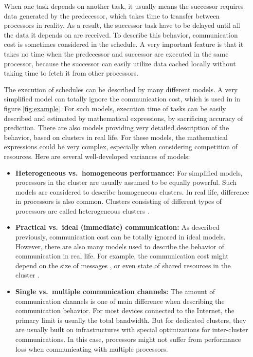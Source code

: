 \documentclass[msc,deptreport, cs]{infthesis}
\begin{document}
When one task depends on another task, it usually means the successor requires data generated by the predecessor, which takes time to transfer between processors in reality. As a result, the successor task have to be delayed until all the data it depends on are received. To describe this behavior, communication cost is sometimes considered in the schedule. A very important feature is that it takes no time when the predecessor and successor are executed in the same processor, because the successor can easily utilize data cached locally without taking time to fetch it from other processors.

The execution of schedules can be described by many different models. A very simplified model can totally ignore the communication cost, which is used in in figure \ref{fig:example}. For such models, execution time of tasks can be easily described and estimated by mathematical expressions, by sacrificing accuracy of prediction. There are also models providing very detailed description of the behavior, based on clusters in real life. For these models, the mathematical expressions could be very complex, especially when considering competition of resources. Here are several well-developed variances of models:
\begin{itemize}
    \item \textbf{Heterogeneous vs.\ homogeneous performance:} For simplified models, processors in the cluster are usually assumed to be equally powerful. Such models are considered to describe homogeneous clusters. In real life, difference in processors is also common. Clusters consisting of different types of processors are called heterogeneous clusters \cite{Topcuoglu}. 
    \item \textbf{Practical vs.\ ideal (immediate) communication:} As described previously, communication cost can be totally ignored in ideal models. However, there are also many models used to describe the behavior of communication in real life. For example, the communication cost might depend on the size of messages \cite{Robert2011}, or even state of shared resources in the cluster \cite{Kwok1999}.
    \item \textbf{Single vs.\ multiple communication channels:} The amount of communication channels is one of main difference when describing the communication behavior. For most devices connected to the Internet, the primary limit is usually the total bandwidth. But for dedicated clusters, they are usually built on infrastructures with special optimizations for inter-cluster communications. In this case, processors might not suffer from performance loss when communicating with multiple processors.
\end{itemize}
\end{document}
